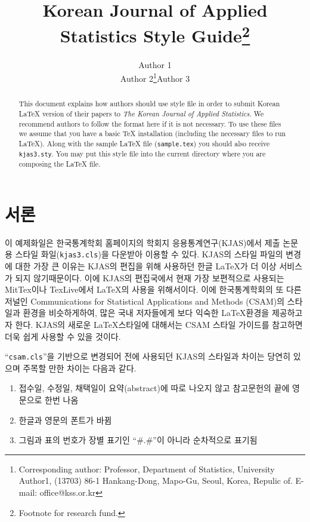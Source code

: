 \documentclass[eng]{kjas3}
\begin{document}
\title{Korean Journal of Applied Statistics Style Guide\footnote{Footnote for research fund.}}

\author{
Author 1\address[a]{Department of Statistics, University of Author1;} 
Author 2\footnote{Corresponding author: Professor, 
Department of Statistics, University Author1, 
(13703) 86-1 Hankang-Dong, Mapo-Gu, Seoul, Korea, Repulic of. 
E-mail: office@kss.or.kr}\same[a]
Author 3\address[b]{Department of Statistics, University of Author3}
}

\begin{abstract}
This document explains how authors should use style file in order
to submit Korean \LaTeX{} version of their papers to 
\textit{The Korean Journal of Applied Statistics}. 
We recommend authors to follow the format here if it is not necessary. 
To use these files we assume that you have a basic \TeX{} installation (including the
necessary files to run \LaTeX{}). Along with the sample \LaTeX{}
file ({\tt sample.tex}) you should also receive {\tt kjas3.sty}. 
You may put this style file into the current
directory where you are composing the \LaTeX{} file.
\end{abstract}



\section{서론} 
이 예제화일은 한국통계학회 홈페이지의 학회지 응용통계연구(KJAS)에서
제출 논문용 스타일 화일({\tt kjas3.cls})을 다운받아 이용할 수 있다.
KJAS의 스타일 파일의 변경에 대한 가장 큰 이유는 KJAS의 편집을 위해 사용하던 한글 \LaTeX{}가 
더 이상 서비스가 되지 않기때문이다. 
이에 KJAS의 편집국에서 현재 가장 보편적으로 사용되는 MitTex이나 TexLive에서 
\LaTeX{}의 사용을 위해서이다. 
이에 한국통계학회의 또 다른 저널인 Communications for Statistical Applications and Methods (CSAM)의 스타일과 
환경을 비슷하게하여, 많은 국내 저자들에게 보다 익숙한 \LaTeX{}환경을 제공하고자 한다.
KJAS의 새로운 \LaTeX{}스타일에 대해서는 CSAM 스타일 가이드를 참고하면 더욱 쉽게 사용할 수 있을 것이다.

``{\tt csam.cls}''을 기반으로 변경되어 전에 사용되던 KJAS의 스타일과 차이는 당연히 있으며
주목할 만한 차이는 다음과 같다.
%
\begin{enumerate}
\item 접수일, 수정일, 채택일이 요약(abstract)에 따로 나오지 않고 참고문헌의 끝에 영문으로 한번 나옴

\item 한글과 영문의 폰트가 바뀜

\item 그림과 표의 번호가 장별 표기인 ``\#.\#''이 아니라 순차적으로 표기됨
\end{enumerate}
%
\end{document}

